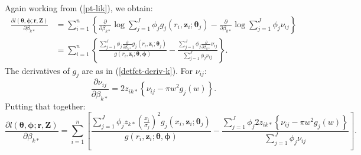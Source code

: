 Again working from (\ref{pt-lik}), we obtain:
\begin{align*}
\frac{\partial l(\bm{\theta}, \bm{\phi}; \mathbf{r},\mathbf{Z})}{\partial \beta_{k*}}  &= \sum_{i=1}^n \left \{ \frac{\partial}{\partial \beta_{k*}} \log \sum_{j=1}^J \phi_j g_j(r_i,\mathbf{z}_i; \bm{\theta}_j) - \frac{\partial}{\partial \beta_{k*}}\log \sum_{j=1}^J \phi_j \nu_{ij}\right \}\\
&= \sum_{i=1}^n \left \{ \frac{ \sum_{j=1}^J \phi_{j} \frac{\partial}{\partial \beta_{k*}}  g_{j} (r_i,\mathbf{z}_i; \bm{\theta}_j)}{g(r_i,\mathbf{z}_i; \bm{\theta}, \bm{\phi})} - \frac{ \sum_{j=1}^J \phi_{j}\frac{\partial}{\partial \beta_{k*}}  \nu_{ij} }{ \sum_{j=1}^J \phi_j \nu_{ij}}\right \}.
\end{align*}
The derivatives of $g_j$ are as in (\ref{detfct-deriv-k}). For $\nu_{ij}$:
\begin{equation*}
\frac{\partial \nu_{ij}}{\partial \beta_{k*}} =  2z_{ik*} \left \{ \nu_{ij} - \pi w^2 g_j(w) \right \}.
\end{equation*}
Putting that together:
\begin{equation*}
\frac{\partial l(\bm{\theta}, \bm{\phi}; \mathbf{r},\mathbf{Z})}{\partial \beta_{k*}}  = \sum_{i=1}^n \left [ \frac{ \sum_{j=1}^J \phi_{j} z_{k*} \left ( \frac{x_i}{\sigma_{j}}\right )^2 g_j(x_i,\mathbf{z}_i; \bm{\theta}_j)}{g(r_i,\mathbf{z}_i; \bm{\theta}, \bm{\phi})} - \frac{ \sum_{j=1}^J \phi_{j}2z_{ik*} \left \{ \nu_{ij} - \pi w^2 g_j(w) \right \} }{ \sum_{j=1}^J \phi_j \nu_{ij}}\right ].
\end{equation*}
